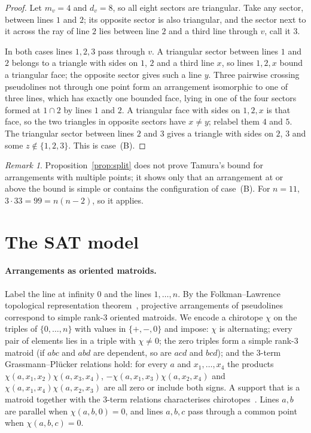 \documentclass[11pt]{article}
\theoremstyle{definition}
\theoremstyle{remark}
\newtheorem{remark}[lemma]{Remark}
\begin{document}
\begin{proof}
Let $m_v = 4$ and $d_v = 8$, so all eight sectors are triangular. Take any sector, between lines
$1$ and $2$; its opposite sector is also triangular, and the sector next to it across the ray of
line $2$ lies between line $2$ and a third line through $v$, call it $3$.

In both cases lines $1, 2, 3$ pass through $v$. A triangular sector between lines $1$ and $2$ belongs
to a triangle with sides on $1$, $2$ and a third line $x$, so lines $1, 2, x$ bound a triangular face;
the opposite sector gives such a line $y$. Three pairwise crossing pseudolines not through one point
form an arrangement isomorphic to one of three lines, which has exactly one bounded face, lying in
one of the four sectors formed at $1 \cap 2$ by lines $1$ and $2$. A triangular face with sides on
$1, 2, x$ is that face, so the two triangles in opposite sectors have $x \ne y$; relabel them $4$
and $5$. The triangular sector between lines $2$ and $3$ gives a triangle with sides on $2$, $3$ and
some $z \notin \{1, 2, 3\}$. This is case~(B).
\end{proof}

\begin{remark}
Proposition~\ref{prop:split} does not prove Tamura's bound for arrangements with multiple points;
it shows only that an arrangement at or above the bound is simple or contains the configuration of
case~(B). For $n = 11$, $3 \cdot 33 = 99 = n(n-2)$, so it applies.
\end{remark}

\section{The SAT model}\label{sec:model}

\paragraph{Arrangements as oriented matroids.} Label the line at infinity $0$ and the lines
$1, \dots, n$. By the Folkman--Lawrence topological representation theorem~\cite{fl,bjorner},
projective arrangements of pseudolines correspond to simple rank-$3$ oriented matroids. We encode a
chirotope $\chi$ on the triples of $\{0, \dots, n\}$ with values in $\{+, -, 0\}$ and impose:
$\chi$ is alternating; every pair of elements lies in a triple with $\chi \ne 0$; the zero triples
form a simple rank-$3$ matroid (if $abc$ and $abd$ are dependent, so are $acd$ and $bcd$); and the
$3$-term Grassmann--Pl\"ucker relations hold: for every $a$ and $x_1, \dots, x_4$ the products
$\chi(a,x_1,x_2)\chi(a,x_3,x_4)$, $-\chi(a,x_1,x_3)\chi(a,x_2,x_4)$ and $\chi(a,x_1,x_4)\chi(a,x_2,x_3)$
are all zero or include both signs. A support that is a matroid together with the $3$-term
relations characterises chirotopes~\cite[Thm.~3.6.2]{bjorner}. Lines $a, b$ are parallel when
$\chi(a,b,0) = 0$, and lines $a, b, c$ pass through a common point when $\chi(a,b,c) = 0$.
\end{document}
